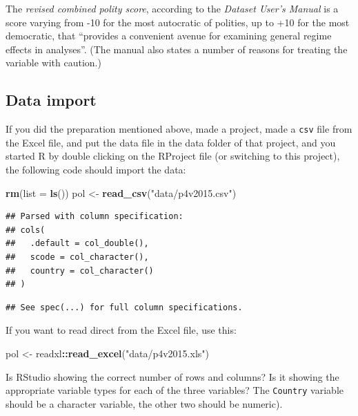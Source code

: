 \documentclass[]{book}
\newenvironment{Shaded}{\begin{snugshade}}{\end{snugshade}}
\newcommand{\DataTypeTok}[1]{\textcolor[rgb]{0.13,0.29,0.53}{#1}}
\newcommand{\KeywordTok}[1]{\textcolor[rgb]{0.13,0.29,0.53}{\textbf{#1}}}
\newcommand{\NormalTok}[1]{#1}
\newcommand{\OperatorTok}[1]{\textcolor[rgb]{0.81,0.36,0.00}{\textbf{#1}}}
\newcommand{\StringTok}[1]{\textcolor[rgb]{0.31,0.60,0.02}{#1}}
\begin{document}
The \emph{revised combined polity score}, according to the \emph{Dataset User's Manual} is a score varying from -10 for the most autocratic of polities, up to +10 for the most democratic, that ``provides a convenient avenue for examining general regime effects in analyses''. (The manual also states a number of reasons for treating the variable with caution.)

\hypertarget{data-import}{%
\subsection{Data import}\label{data-import}}

If you did the preparation mentioned above, made a project, made a \texttt{csv} file from the Excel file, and put the data file in the data folder of that project, and you started R by double clicking on the RProject file (or switching to this project), the following code should import the data:

\begin{Shaded}
\begin{Highlighting}[]
\KeywordTok{rm}\NormalTok{(}\DataTypeTok{list =} \KeywordTok{ls}\NormalTok{())}
\NormalTok{pol <-}\StringTok{ }\KeywordTok{read_csv}\NormalTok{(}\StringTok{"data/p4v2015.csv"}\NormalTok{)}
\end{Highlighting}
\end{Shaded}

\begin{verbatim}
## Parsed with column specification:
## cols(
##   .default = col_double(),
##   scode = col_character(),
##   country = col_character()
## )
\end{verbatim}

\begin{verbatim}
## See spec(...) for full column specifications.
\end{verbatim}

If you want to read direct from the Excel file, use this:

\begin{Shaded}
\begin{Highlighting}[]
\NormalTok{pol <-}\StringTok{ }\NormalTok{readxl}\OperatorTok{::}\KeywordTok{read_excel}\NormalTok{(}\StringTok{"data/p4v2015.xls"}\NormalTok{)}
\end{Highlighting}
\end{Shaded}

Is RStudio showing the correct number of rows and columns? Is it showing the appropriate variable types for each of the three variables? The \texttt{Country} variable should be a character variable, the other two should be numeric).
\end{document}
